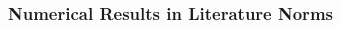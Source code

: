 \begin{frame}
    \frametitle{Numerical Results in Literature Norms}

    \vspace*{\fill}
    \begin{multicols}{2}

        \begin{center}
            \begin{minipage}{0.4\textwidth}
                \begin{figure}[!ht]
                    
                \end{figure}
            \end{minipage}
        \end{center}

        \vfill\null
        \columnbreak

        \begin{center}
            \begin{minipage}{0.4\textwidth}
                \begin{figure}[!ht]
                    
                \end{figure}
            \end{minipage}
        \end{center}

    \end{multicols}
    \vspace*{\fill}
    
\end{frame}


